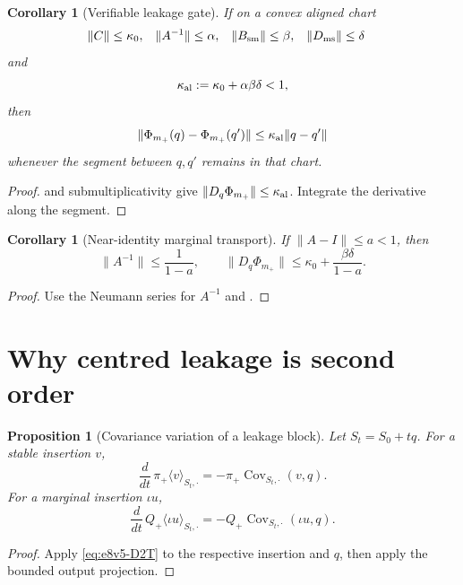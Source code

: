 \documentclass[11pt,oneside]{book}
\newtheorem{proposition}[theorem]{Proposition}
\newtheorem{corollary}[theorem]{Corollary}
\theoremstyle{definition}
\theoremstyle{remark}
\begin{document}
\begin{corollary}[Verifiable leakage gate]
\label{cor:e8v5-leakage-gate}
If on a convex aligned chart
\begin{align}
 \|C\|&\le\kappa_0,&
 \|A^{-1}\|&\le\alpha,&
 \|B_{\rm sm}\|&\le\beta,&
 \|D_{\rm ms}\|&\le\delta                           \label{eq:e8v5-four-bounds}
\end{align}
and
\[
 \kappa_{\rm al}:=\kappa_0+\alpha\beta\delta<1,      \label{eq:e8v5-gate}
\]
then
\[
 \|\Phi_{m_+}(q)-\Phi_{m_+}(q')\|
 \le\kappa_{\rm al}\|q-q'\|                         \label{eq:e8v5-aligned-contraction}
\]
whenever the segment between \(q,q'\) remains in that chart.
\end{corollary}

\begin{proof}
 and submultiplicativity give
\(\|D_q\Phi_{m_+}\|\le\kappa_{\rm al}\).  Integrate the derivative
along the segment.
\end{proof}

\begin{corollary}[Near-identity marginal transport]
\label{cor:e8v5-neumann}
If \(\|A-I\|\le a<1\), then
\[
 \|A^{-1}\|\le\frac1{1-a},\qquad
 \|D_q\Phi_{m_+}\|
 \le\kappa_0+\frac{\beta\delta}{1-a}.                \label{eq:e8v5-neumann}
\]
\end{corollary}

\begin{proof}
Use the Neumann series for \(A^{-1}\) and
.
\end{proof}

\section{Why centred leakage is second order}
\label{sec:e8v5-centred}

\begin{proposition}[Covariance variation of a leakage block]
\label{prop:e8v5-covariance-leakage}
Let \(S_t=S_0+tq\).  For a stable insertion \(v\),
\[
 \frac d{dt}\,
 \pi_+\langle v\rangle_{S_t,\cdot}
 =-\pi_+\operatorname{Cov}_{S_t,\cdot}(v,q).         \label{eq:e8v5-B-variation}
\]
For a marginal insertion \(\iota u\),
\[
 \frac d{dt}\,
 Q_+\langle\iota u\rangle_{S_t,\cdot}
 =-Q_+\operatorname{Cov}_{S_t,\cdot}(\iota u,q).     \label{eq:e8v5-D-variation}
\]
\end{proposition}

\begin{proof}
Apply \eqref{eq:e8v5-D2T} to the respective insertion and \(q\), then
apply the bounded output projection.
\end{proof}
\end{document}
